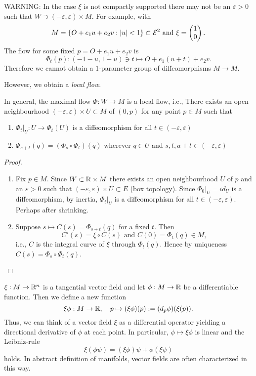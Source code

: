 WARNING: In the case $\xi$ is not compactly supported there may not be an $\varepsilon>0$ such that $W \supset (-\varepsilon,\varepsilon) \times M$. For example, with
	\[ M= \{ O+e_1u + e_2v : \left| u\right|<1 \} \subset \mathcal E^2 \text{ and } \xi = \begin{pmatrix} 1\\0 \end{pmatrix}. \]
The flow for some fixed $p= O+e_1u +e_2v$ is 
	\[ \Phi_t(p): (-1-u, 1-u) \ni t \mapsto O+e_1(u+t)+e_2 v. \]
Therefore we cannot obtain a $1$-parameter group of diffeomorphisms $M \to M$.

However, we obtain a \emph{local flow}.
	
\begin{remark}
	In general, the maximal flow $\Phi : W \to M$ is a local flow, i.e., There exists an open neighbourhood $(-\varepsilon , \varepsilon) \times U \subset M$ of $(0,p)$ for any point $p \in M$ such that
	\begin{enumerate}
		\item $\Phi_t |_{U}: U \to \Phi_t(U)$ is a diffeomorphism for all $t \in (-\varepsilon,\varepsilon)$
		\item $\Phi_{s+t}(q) = (\Phi_s \circ \Phi_t)(q)$ wherever $q \in U$ and $s,t,a+t \in (-\varepsilon,\varepsilon)$
	\end{enumerate}
\end{remark} 

\begin{proof}
	\begin{enumerate}
		\item Fix $p \in M$. Since $W \subset \mathbb R \times M$ there exists an open neighbourhood $U$ of $p$ and an $\varepsilon>0$ such that $(-\varepsilon,\varepsilon) \times U \subset E$ (box topology). Since $\Phi_0 |_{U} = id_U$ is a diffeomorphism, by inertia, $\Phi_t|_U$ is a diffeomorphism for all $t \in (-\varepsilon,\varepsilon)$. Perhaps after shrinking.
		
		\item Suppose $s \mapsto C(s)= \Phi_{s+t}(q)$ for a fixed $t$. Then 
		\[ C'(s) = \xi \circ C(s)\text{ and } C(0)=\Phi_t(q) \in M, \]
		i.e., $C$ is the integral curve of $\xi$ through $\Phi_t(q)$. Hence by uniqueness $C(s)=\Phi_s\circ \Phi_t(q)$.
	\end{enumerate}
\end{proof}

\begin{remark}
	
	$ \xi: M \rightarrow \mathbb R^n $ is a tangential vector field and let $ \phi : M \rightarrow \mathbb R $ be a differentiable function. Then we define a new function
		\[ \xi\phi: M \rightarrow \mathbb R, \quad p \mapsto (\xi\phi)(p) := (d_p\phi)(\xi(p)). \]
	Thus, we can think of a vector field $ \xi $ as a differential operator yielding a directional derivative of $ \phi $ at each point. In particular, $ \phi \mapsto \xi\phi $ is linear and the Leibniz-rule
		\[ \xi(\phi\psi) = (\xi\phi)\psi + \phi(\xi\psi) \]
	holds.
	In abstract definition of manifolds, vector fields are often characterized in this way.
	
\end{remark}

